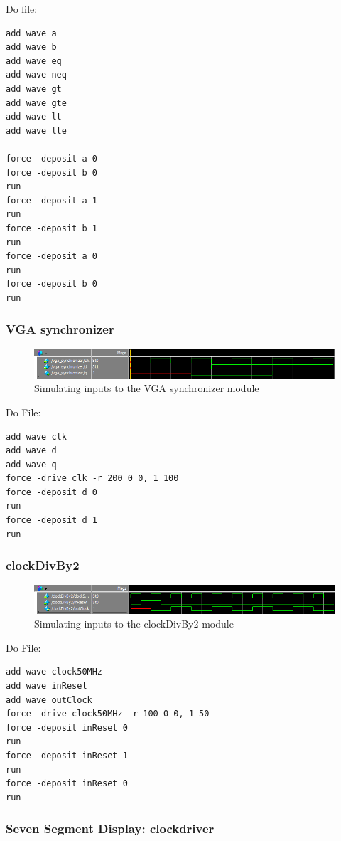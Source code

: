 \documentclass[a4paper]{article}
\begin{document}
Do file:

\begin{Verbatim}
add wave a
add wave b
add wave eq
add wave neq
add wave gt
add wave gte
add wave lt
add wave lte

force -deposit a 0
force -deposit b 0
run
force -deposit a 1
run
force -deposit b 1
run
force -deposit a 0
run
force -deposit b 0
run
\end{Verbatim}

\subsubsection{VGA synchronizer}

\begin{figure}[H]
    \includegraphics[width=0.8 \linewidth]{images/vgaSyncSim.png}
    \caption{Simulating inputs to the VGA synchronizer module}
    \label{vgaSyncSim}
\end{figure}

Do File:

\begin{Verbatim}
add wave clk
add wave d
add wave q
force -drive clk -r 200 0 0, 1 100
force -deposit d 0
run
force -deposit d 1
run
\end{Verbatim}

\subsubsection{clockDivBy2}

\begin{figure}[H]
    \includegraphics[width=0.8 \linewidth]{images/clockDivBy2Sim.png}
    \caption{Simulating inputs to the clockDivBy2 module}
    \label{clockDivBy2Sim}
\end{figure}

Do File:

\begin{Verbatim}
add wave clock50MHz
add wave inReset
add wave outClock
force -drive clock50MHz -r 100 0 0, 1 50
force -deposit inReset 0
run
force -deposit inReset 1
run
force -deposit inReset 0
run
\end{Verbatim}

\subsubsection{Seven Segment Display: clockdriver}
\end{document}
